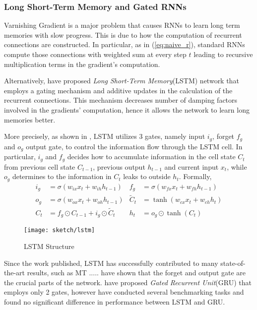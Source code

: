 \subsubsection{Long Short-Term Memory and Gated RNNs}
Varnishing Gradient is a major problem that causes RNNs to learn long term memories with slow progress. This is due to how the computation of recurrent connections are constructed. In particular, as in (\ref{eq:naive_r}), standard RNNs compute those connections with weighted sum at every step $t$ leading to recursive multiplication terms in the gradient's computation.

Alternatively,\cite{HochreiterLongshorttermmemory1997} have proposed \textit{Long Short-Term Memory}(LSTM) network that employs a gating mechanism and additive updates in the calculation of the recurrent connections. This mechanism decreases number of damping factors involved in the gradients' computation, hence it allows the network to learn long memories better.

More precisely, as shown in \addfigure{\ref{fig:lstm_structure}}, LSTM utilizes 3 gates, namely input $i_g$, forget $f_g$ and $o_g$ output gate, to control the information flow through the LSTM cell. In particular, $i_g$ and $f_g$ decides how to accumulate information in the cell state $C_t$ from previous cell state $C_{t-1}$, previous output $h_{t-1}$ and current input $x_t$, while $o_g$ determines to the information in $C_t$ leaks to outside $h_t$. Formally, 
\begin{align}
	i_g &= \sigma( w_{ix} x_t + w_{ih} h_{t-1} )  &  	f_g &= \sigma( w_{fx} x_t + w_{fh} h_{t-1} )\\
	o_g &= \sigma( w_{ox} x_t + w_{oh} h_{t-1} ) & \widetilde{C}_t &= \tanh(w_{cx} x_t + w_{ch} h_t) \\
	C_t &= f_g \odot C_{t-1} + i_g \odot \widetilde{C}_t & h_{t} &= o_g \odot\tanh(C_t)
\end{align}


\begin{figure}[h]
\centering
\texttt{[image: sketch/lstm]}
\caption{LSTM Structure} 

\label{fig:lstm_structure} 
\end{figure}

Since the work published, LSTM has successfully contributed to many state-of-the-art results, such as MT ..... \cite{GreffLSTMsearchspace2017} have shown that the forget and output gate are the crucial parts of the network.  \cite{ChoLearningPhraseRepresentations2014a} have proposed \textit{Gated Recurrent Unit}(GRU) that employs only 2 gates, however \cite{Jozefowiczempiricalexplorationrecurrent2015a} have conducted several benchmarking tasks and found no significant difference in performance between LSTM and GRU. 